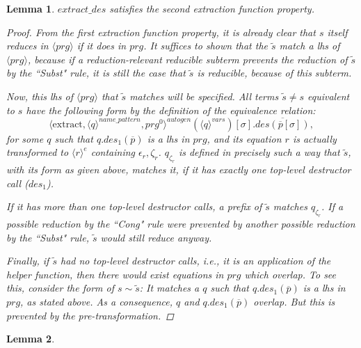 \documentclass[11pt]{article} %
\newtheorem*{lemma*}{Lemma}
\begin{document}
\begin{framed}
\begin{lemma*}

$extract\_des$ satisfies the second extraction function property.

\begin{proof}

From the first extraction function property, it is already clear that $s$ itself reduces in $\langle prg \rangle$ if it does in $prg$. It suffices to shown that the $\widetilde{s}$ match a lhs of $\langle prg \rangle$, because if a reduction-relevant reducible subterm prevents the reduction of $\widetilde{s}$ by the ``Subst" rule, it is still the case that $\widetilde{s}$ is reducible, because of this subterm.

Now, this lhs of $\langle prg \rangle$ that $\widetilde{s}$ matches will be specified. All terms $\widetilde{s} \neq s$ equivalent to $s$ have the following form by the definition of the equivalence relation:
\begin{equation*}
\langle \textrm{extract}, \langle q \rangle^{name\_pattern}, prg^0 \rangle^{autogen}(\langle q \rangle^{vars})[\sigma].\overline{des(\overline{p}[\sigma])},
\end{equation*}
for some $q$ such that $q.des_1(\overline{p})$ is a lhs in $prg$, and its equation $r$ is actually transformed to $\langle r \rangle^e$ containing $\epsilon_r, \zeta_r$. $q_{\zeta_r}$ is defined in precisely such a way that $\widetilde{s}$, with its form as given above, matches it, if it has exactly one top-level destructor call ($des_1$).

If it has more than one top-level destructor calls, a prefix of $\widetilde{s}$ matches $q_{\zeta_r}$. If a  possible reduction by the ``Cong" rule were prevented by another possible reduction by the ``Subst" rule, $\widetilde{s}$ would still reduce anyway.

Finally, if $\widetilde{s}$ had no top-level destructor calls, i.e., it is an application of the helper function, then there would exist equations in $prg$ which overlap. To see this, consider the form of $s \sim \widetilde{s}$: It matches a $q$ such that $q.des_1(\overline{p})$ is a lhs in $prg$, as stated above. As a consequence, $q$ and $q.des_1(\overline{p})$ overlap. But this is prevented by the pre-transformation.

\end{proof}

\end{lemma*}

\begin{lemma*}


\end{lemma*}
\end{framed}
\end{document}

